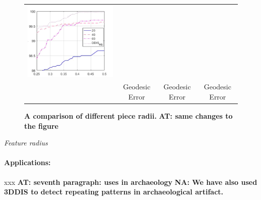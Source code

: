 \documentclass[10pt,twocolumn,letterpaper]{article}
\newcommand{\colornote}[3]{{\color{#1}\bf{#2: #3}\normalfont}}
\newcommand{\colornote}[3]{}
\newcommand {\ayellet}[1]{\colornote{blue}{AT}{#1}}
\newcommand {\nadav}[1]{\colornote{red}{NA}{#1}}
\begin{document}
{\begin{figure}[htb]
\begin{tabular}{cccc}
		\includegraphics[scale=0.5]{figures/PieceSizeHigh.png}
		\\
		& Geodesic Error &  Geodesic Error &  Geodesic Error\\
	\end{tabular}
	\caption{{\bf A comparison of different piece radii.} \ayellet{same changes to the figure}}
		\label{fig:DifferentRadii}
\end{figure}
}

\textit{Feature radius} 

\paragraph{Applications:} xxx
\ayellet{seventh paragraph: uses in archaeology}
\nadav{We have also used 3DDIS to detect repeating patterns in archaeological artifact. }
\end{document}
